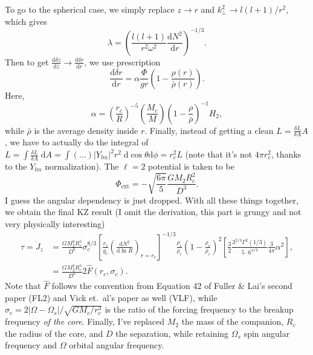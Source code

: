 \documentclass[11pt,
        usenames, %
        dvipsnames %
    ]{article}
\newcommand*{\rd}[2]{\frac{\mathrm{d}#1}{\mathrm{d}#2}}
\newcommand*{\abs}[1]{\left|#1\right|}
\newcommand*{\p}[1]{\left(#1\right)}
\newcommand*{\s}[1]{\left[#1\right]}
\begin{document}
To go to the spherical case, we simply replace $z \to r$ and $k_\perp^2 \to l(l
+ 1)/r^2$, which gives
\begin{equation}
    \lambda = \p{\frac{l(l + 1)}{r^2\omega^2} \rd{N^2}{r}}^{-1/3}.
\end{equation}
Then to get $\rd{\delta z}{z} \to \rd{\delta r}{r}$, we use prescription
\begin{equation}
    \rd{\delta r}{r} = \alpha \frac{\Phi}{gr}
        \p{1 - \frac{\rho(r)}{\bar{\rho}(r)}}.
\end{equation}
Here,
\begin{equation}
    \alpha = \p{\frac{r_c}{R}}^{-5}\p{\frac{M_c}{M}}\p{1 -
        \frac{\rho}{\bar{\rho}}}^{-1}H_2,
\end{equation}
while $\bar{\rho}$ is the average density inside $r$. Finally, instead of
getting a clean $L = \frac{\delta L}{\delta A}A$, we have to actually do the
integral of $L = \int \frac{\delta L}{\delta A}\;\mathrm{d}A = \int (\dots)
\abs{Y_{lm}}^2 r^2 \;\mathrm{d}\cos\theta \mathrm{d}\phi = r_c^2 L$ (note that
it's not $4\pi r_c^2$, thanks to the $Y_{lm}$ normalization). The $\ell = 2$
potential is taken to be
\begin{equation}
    \Phi_{\mathrm{ext}} = -\sqrt{\frac{6\pi}{5}}\frac{GM_2R_c^2}{D^3}.
\end{equation}
I guess the angular dependency is just dropped. With all these things together,
we obtain the final KZ result (I omit the derivation, this part is grungy and
not very physically interesting)
\begin{align}
    \tau = \dot{J}_z &= \frac{GM_2^2R_c^5}{D^6} \sigma_c^{8/3}
        \s{\frac{r_c}{g_c}\p{\rd{N^2}{\ln R}}_{r = r_c}}^{-1/3}
            \frac{\rho_c}{\bar{\rho}_c} \p{1 - \frac{\rho_c}{\bar{\rho}_c}}^2
            \s{\frac{3}{2}\frac{3^{2/3}\Gamma^2(1/3)}{5 \cdot
                6^{4/3}} \frac{3}{4\pi}\alpha^2},\\
        &= \frac{GM_2^2R_c^5}{D^6}2\hat{F}\p{r_c, \sigma_c}.
            \label{eq:tau_fhat}
\end{align}
Note that $\hat{F}$ follows the convention from Equation 42 of Fuller \& Lai's
second paper (FL2) and Vick et.\ al's paper as well (VLF), while $\sigma_c =
2\abs{\Omega - \Omega_s} / \sqrt{GM_c / r_c^3}$ is the ratio of the forcing
frequency to the breakup frequency \emph{of the core}. Finally, I've replaced
$M_2$ the mass of the companion, $R_c$ the radius of the core, and $D$ the
separation, while retaining $\Omega_s$ spin angular frequency and $\Omega$
orbital angular frequency.
\end{document}
